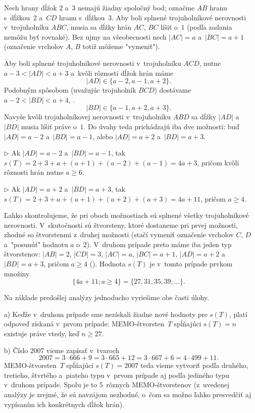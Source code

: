 {
Nech hrany dĺžok $2$ a~$3$ nemajú žiadny spoločný bod; označme $AB$ hranu s~dĺžkou~$2$ a~$CD$ hranu s~dĺžkou~$3$. Aby boli splnené trojuholníkové nerovnosti v~trojuholníku $ABC$, musia sa dĺžky hrán $AC$, $BC$ líšiť o~$1$ (podľa zadania nemôžu byť rovnaké). Bez ujmy na všeobecnosti nech $|AC|=a$ a~$|BC|=a+1$ (označenie vrcholov $A$, $B$ totiž môžeme "vymeniť").

Aby boli splnené trojuholníkové nerovnosti v~trojuholníku $ACD$, nutne $a-3<|AD|<a+3$ a~kvôli rôznosti dĺžok hrán máme
$$
|AD|\in\{a-2,a-1,a+2\}.
$$
Podobným spôsobom (uvažujúc trojuholník $BCD$) dostávame $a-2<|BD|<a+4$, \tj.
$$
|BD|\in\{a-1,a+2,a+3\}.
$$
Navyše kvôli trojuholníkovej nerovnosti v~trojuholníku $ABD$ sa dĺžky $|AD|$ a~$|BD|$ musia líšiť práve o~$1$. Do úvahy teda prichádzajú iba dve možnosti: buď $|AD|=a-2$ a~$|BD|=a-1$, alebo $|AD|=a+2$ a~$|BD|=a+3$.
\item{$\triangleright$}
Ak $|AD|=a-2$ a~$|BD|=a-1$, tak $s(T)=2+3+a+(a+1)+(a-2)+(a-1)=4a+3$, pričom kvôli rôznosti hrán nutne $a\ge 6$.
\item{$\triangleright$}
Ak $|AD|=a+2$ a~$|BD|=a+3$, tak $s(T)=2+3+a+(a+1)+(a+2)+(a+3)=4a+11$, pričom $a\ge 4$.

Ľahko skontrolujeme, že pri oboch možnostiach sú splnené všetky trojuholníkové nerovnosti. V~skutočnosti sú štvorsteny, ktoré dostaneme pri prvej možnosti, zhodné so štvorstenmi z~druhej možnosti (stačí vymeniť označenie vrcholov $C$, $D$ a~"posunúť" hodnotu $a$ o~$2$). V~druhom prípade preto máme iba jeden typ štvorstenov: $|AB|=2$, $|CD|=3$, $|AC|=a$, $|BC|=a+1$, $|AD|=a+2$ a~$|BD|=a+3$, pričom $a\ge4$ (\obr). Hodnota $s(T)$ je v~tomto prípade prvkom množiny
$$
\{4a+11;a\ge4\}=\{27,31,35,39,\dots\}.
$$ 
%

\smallskip
Na základe predošlej analýzy jednoducho vyriešime obe časti úlohy. 

\smallskip
a) Keďže v~druhom prípade sme nezískali žiadne nové hodnoty pre $s(T)$, platí odpoveď získaná v~prvom prípade: MEMO-štvorsten~$T$ spĺňajúci $s(T)=n$ existuje práve vtedy, keď $n\ge27$.

\smallskip
b) Číslo 2007 vieme zapísať v~tvaroch
$$
2007=3\cdot666+9=3\cdot665+12=3\cdot667+6=4\cdot499+11.
$$
MEMO-štvorsten~$T$ spĺňajúci $s(T)=2007$ teda vieme vytvoriť podľa druhého, tretieho, štvrtého a~piateho typu v~prvom prípade aj podľa jediného typu v~druhom prípade. Spolu je to 5~rôznych MEMO-štvorstenov (z~uvedenej analýzy je zrejmé, že sú navzájom nezhodné, o~čom sa možno ľahko presvedčiť aj vypísaním ich konkrétnych dĺžok hrán).  
}

